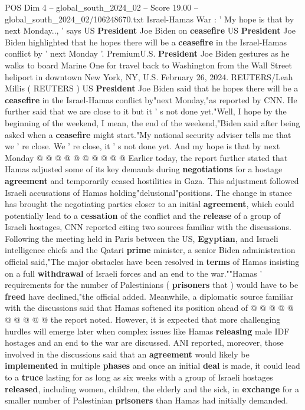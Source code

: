\begin{textsample}{POS Dim 4 – global\_south\_2024\_02 – Score 19.00 – global\_south\_2024\_02/106248670.txt}  \label{ex:f4_pos_080}
Israel-Hamas War : ' My hope is that by next Monday.., ' says US \textbf{President} Joe Biden on \textbf{ceasefire} US \textbf{President} Joe Biden highlighted that he hopes there will be a \textbf{ceasefire} in the Israel-Hamas conflict by ' next Monday '.
PremiumU.S. \textbf{President} Joe Biden gestures as he walks to board Marine One for travel back to Washington from the Wall Street heliport in downtown New York, NY, U.S.
February 26, 2024.
REUTERS/Leah Millis ( REUTERS ) US \textbf{President} Joe Biden said that he hopes there will be a \textbf{ceasefire} in the Israel-Hamas conflict by"next Monday,"as reported by CNN.
He further said that we are close to it but it ' s not done yet."Well, I hope by the beginning of the weekend, I mean, the end of the weekend,"Biden said after being asked when a \textbf{ceasefire} might start."My national security adviser tells me that we ' re close.
We ' re close, it ' s not done yet.
And my hope is that by next Monday @ @ @ @ @ @ @ @ @ @ Earlier today, the report further stated that Hamas adjusted some of its key demands during \textbf{negotiations} for a hostage \textbf{agreement} and temporarily ceased hostilities in Gaza.
This adjustment followed Israeli accusations of Hamas holding"delusional"positions.
The change in stance has brought the negotiating parties closer to an initial \textbf{agreement}, which could potentially lead to a \textbf{cessation} of the conflict and the \textbf{release} of a group of Israeli hostages, CNN reported citing two sources familiar with the discussions.
Following the meeting held in Paris between the US, \textbf{Egyptian}, and Israeli intelligence chiefs and the Qatari \textbf{prime} minister, a senior Biden administration official said,"The major obstacles have been resolved in \textbf{terms} of Hamas insisting on a full \textbf{withdrawal} of Israeli forces and an end to the war.""Hamas ' requirements for the number of Palestinians ( \textbf{prisoners} that ) would have to be \textbf{freed} have declined,"the official added.
Meanwhile, a diplomatic source familiar with the discussions said that Hamas softened its position ahead of @ @ @ @ @ @ @ @ @ @ the report noted.
However, it is expected that more challenging hurdles will emerge later when complex issues like Hamas \textbf{releasing} male IDF hostages and an end to the war are discussed.
ANI reported, moreover, those involved in the discussions said that an \textbf{agreement} would likely be \textbf{implemented} in multiple \textbf{phases} and once an initial \textbf{deal} is made, it could lead to a \textbf{truce} lasting for as long as six weeks with a group of Israeli hostages \textbf{released}, including women, children, the elderly and the sick, in \textbf{exchange} for a smaller number of Palestinian \textbf{prisoners} than Hamas had initially demanded.

\end{textsample}
